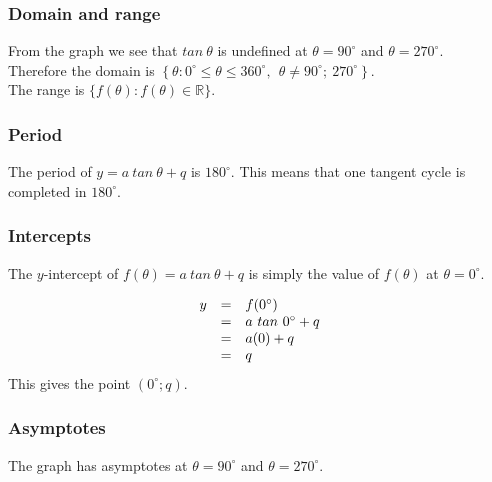 \subsubsection*{Domain and range}

From the graph we see that $tan ~\theta$ is undefined at
$\theta = 90^{\circ}$ and $\theta = 270^{\circ}$. \\
Therefore the domain is
$\left\{ \theta: 0^{\circ} \leq \theta \leq 360^{\circ},~~\theta \ne 90^{\circ};~ 270^{\circ}\right\}$.\\

The range is $\{f(\theta): f(\theta) \in \mathbb{R}\}$.

\subsubsection*{Period}
The period of $y=a~tan ~\theta+q$ is $180^{\circ}$. This means that one tangent cycle is completed in $180^{\circ}$. 


\subsubsection*{Intercepts}
\nopagebreak
The $y$-intercept of $f(\theta)=a~tan ~\theta+q$ is simply the value of
$f(\theta)$ at $\theta = {0}^{\circ}$.

\begin{equation*}
\begin{array}{ccl}\hfill y& =& f({0}^{\circ })\hfill \\
 & =& a~tan ~ {0}^{\circ } + q \hfill \\
 & =& a(0)+q\hfill \\
 & =& q\hfill 
\end{array}
\end{equation*}
This gives the point $(0^{\circ}; q)$.
\subsubsection*{Asymptotes}
\nopagebreak
The graph has asymptotes at $\theta ={90}^{\circ }$ and $\theta={270}^{\circ }$.

